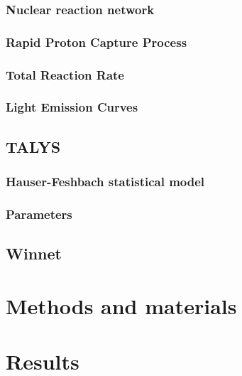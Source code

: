 \documentclass[final]{thesis} %
\begin{document}
\subsubsection{Nuclear reaction network}
\label{subsec:nrn}

\subsubsection{Rapid Proton Capture Process}
\label{subsec:rpprocess}

\subsubsection{Total Reaction Rate}
\label{subsec:trr}

\subsubsection{Light Emission Curves}
\label{subsec:lec}


\subsection{TALYS}
\label{sec:talys}

\subsubsection{Hauser-Feshbach statistical model}
\label{subsec:HFsm}

\subsubsection{Parameters}
\label{subsec:tparams}


\subsection{Winnet}
\label{sec:winnet}

\section{Methods and materials}
\label{sec:methods-and-materials}




\section{Results}
\label{sec:results}

\end{document}
